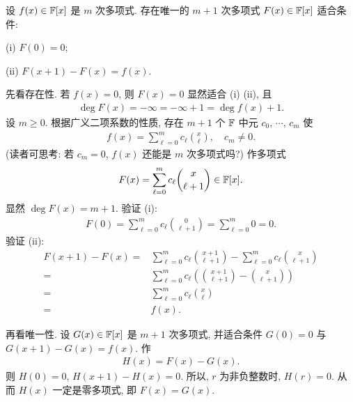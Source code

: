 \begin{proposition}
    设 $f(x) \in \mathbb{F}[x]$ 是 $m$ 次多项式. 存在唯一的 $m+1$ 次多项式 $F(x) \in \mathbb{F}[x]$ 适合条件:

    (i) $F(0) = 0$;

    (ii) $F(x + 1) - F(x) = f(x)$.
\end{proposition}

\begin{pf}
    先看存在性. 若 $f(x) = 0$, 则 $F(x) = 0$ 显然适合 (i) (ii), 且
    \begin{align*}
        \deg F(x) = -\infty = -\infty + 1 = \deg f(x) + 1.
    \end{align*}
    设 $m \geq 0$. 根据广义二项系数的性质, 存在 $m+1$ 个 $\mathbb{F}$ 中元 $c_0$, $\cdots$, $c_{m}$ 使
    \begin{align*}
        f(x) = \sum_{\ell = 0}^{m} c_\ell \binom{x}{\ell}, \quad c_{m} \neq 0.
    \end{align*}
    (读者可思考: 若 $c_{m} = 0$, $f(x)$ 还能是 $m$ 次多项式吗?) 作多项式
    \begin{align*}
        F(x) = \sum_{\ell = 0}^{m} c_\ell \binom{x}{\ell+1} \in \mathbb{F}[x].
    \end{align*}
    显然 $\deg F(x) = m + 1$. 验证 (i):
    \begin{align*}
        F(0) = \sum_{\ell = 0}^{m} c_\ell \binom{0}{\ell+1} = \sum_{\ell = 0}^{m} 0 = 0.
    \end{align*}
    验证 (ii):
    \begin{align*}
        F(x + 1) - F(x)
        = {} & \sum_{\ell = 0}^{m} c_\ell \binom{x+1}{\ell+1} - \sum_{\ell = 0}^{m} c_\ell \binom{x}{\ell+1} \\
        = {} & \sum_{\ell = 0}^{m} c_\ell \left( \binom{x+1}{\ell+1} - \binom{x}{\ell+1} \right)             \\
        = {} & \sum_{\ell = 0}^{m} c_\ell \binom{x}{\ell}                                                    \\
        = {} & f(x).
    \end{align*}

    再看唯一性. 设 $G(x) \in \mathbb{F}[x]$ 是 $m+1$ 次多项式, 并适合条件 $G(0) = 0$ 与 $G(x + 1) - G(x) = f(x)$. 作
    \begin{align*}
        H(x) = F(x) - G(x).
    \end{align*}
    则 $H(0) = 0$, $H(x + 1) - H(x) = 0$. 所以, $r$ 为非负整数时, $H(r) = 0$. 从而 $H(x)$ 一定是零多项式, 即 $F(x) = G(x)$.
\end{pf}

